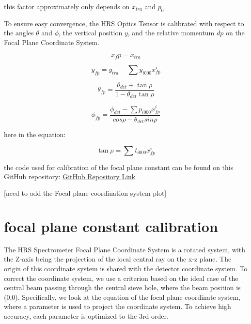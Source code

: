 this factor approximately only depends on $x_{tra}$ and $p_0$.

To ensure easy convergence, the HRS Optics Tensor is calibrated with respect to the angles $\theta$ and $\phi$, the vertical position $y$, and the relative momentum $dp$ on the Focal Plane Coordinate System.

\begin{equation}
    x_fp = x_{tra}    \label{eq:cpt3_fps_1}
\end{equation}

\begin{equation}
    y_{fp} = y_{tra} - \sum y_{i000}x^i_{fp}  
\end{equation}

\begin{equation}
\theta_{fp} = \frac{\theta_{det} + \tan\rho}{1 - \theta_{det}\tan\rho}
\end{equation}


\begin{equation}
    \phi_{fp} = \frac{\phi_{det} - \sum p_{i000}x^i_{fp}}{cos \rho - \theta_{det} sin\rho}
\end{equation}

here  in the equation:

\begin{equation}
    \tan\rho  = \sum t_{i000}x^i_{fp} \label{eq:cpt3_fps_5}
\end{equation}


the code used for calibration of the focal plane constant can be found on this GitHub repository: \hyperlink{https://github.com/Jiansiyu/GeneralScripts/blob/master/vdcConstantOpt}{GitHub Repository Link}


[need to add the Focal plane coordination system plot]

\section{focal plane constant calibration}

The HRS Spectrometer Focal Plane Coordinate System is a rotated system, with the Z-axis being the projection of the local central ray on the x-z plane. The origin of this coordinate system is shared with the detector coordinate system. To correct the coordinate system, we use a criterion based on the ideal case of the central beam passing through the central sieve hole, where the beam position is (0,0). Specifically, we look at the equation of the focal plane coordinate system, where a parameter is used to project the coordinate system. To achieve high accuracy, each parameter is optimized to the 3rd order.

